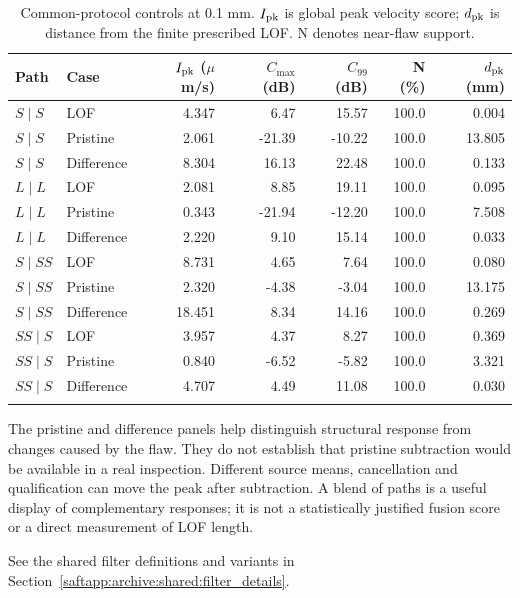 \begin{table}[htbp]\centering\small
\caption{Common-protocol controls at 0.1 mm. $I_{\rm pk}$ is global peak velocity score; $d_{\rm pk}$ is distance from the finite prescribed LOF. N denotes near-flaw support.}
\label{saftapp:archive:full:controls}
\begin{tabular}{@{}llrrrrr@{}}\toprule
Path & Case & $I_{\rm pk}$ ($\mu$m/s) & $C_{\max}$ (dB) & $C_{99}$ (dB) & N (\%) & $d_{\rm pk}$ (mm)\\\midrule
$S\mid S$ & LOF & 4.347 & 6.47 & 15.57 & 100.0 & 0.004 \\
$S\mid S$ & Pristine & 2.061 & -21.39 & -10.22 & 100.0 & 13.805 \\
$S\mid S$ & Difference & 8.304 & 16.13 & 22.48 & 100.0 & 0.133 \\
\addlinespace
$L\mid L$ & LOF & 2.081 & 8.85 & 19.11 & 100.0 & 0.095 \\
$L\mid L$ & Pristine & 0.343 & -21.94 & -12.20 & 100.0 & 7.508 \\
$L\mid L$ & Difference & 2.220 & 9.10 & 15.14 & 100.0 & 0.033 \\
\addlinespace
$S\mid SS$ & LOF & 8.731 & 4.65 & 7.64 & 100.0 & 0.080 \\
$S\mid SS$ & Pristine & 2.320 & -4.38 & -3.04 & 100.0 & 13.175 \\
$S\mid SS$ & Difference & 18.451 & 8.34 & 14.16 & 100.0 & 0.269 \\
\addlinespace
$SS\mid S$ & LOF & 3.957 & 4.37 & 8.27 & 100.0 & 0.369 \\
$SS\mid S$ & Pristine & 0.840 & -6.52 & -5.82 & 100.0 & 3.321 \\
$SS\mid S$ & Difference & 4.707 & 4.49 & 11.08 & 100.0 & 0.030 \\
\addlinespace

\bottomrule\end{tabular}
\end{table}

The pristine and difference panels help distinguish structural response from changes caused by the flaw. They do not establish that pristine subtraction would be available in a real inspection. Different source means, cancellation and qualification can move the peak after subtraction. A blend of paths is a useful display of complementary responses; it is not a statistically justified fusion score or a direct measurement of LOF length.

See the shared filter definitions and variants in Section~\ref{saftapp:archive:shared:filter_details}.
